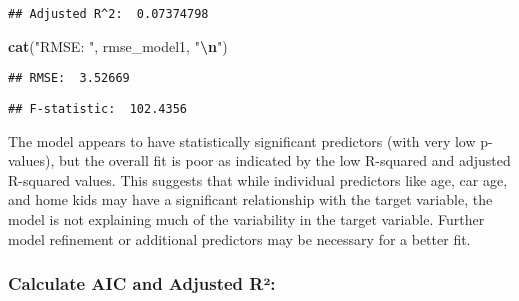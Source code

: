 \documentclass[
]{article}
\newenvironment{Shaded}{\begin{snugshade}}{\end{snugshade}}
\newcommand{\DecValTok}[1]{\textcolor[rgb]{0.00,0.00,0.81}{#1}}
\newcommand{\FunctionTok}[1]{\textcolor[rgb]{0.13,0.29,0.53}{\textbf{#1}}}
\newcommand{\NormalTok}[1]{#1}
\newcommand{\SpecialCharTok}[1]{\textcolor[rgb]{0.81,0.36,0.00}{\textbf{#1}}}
\newcommand{\StringTok}[1]{\textcolor[rgb]{0.31,0.60,0.02}{#1}}
\begin{document}
\begin{verbatim}
## Adjusted R^2:  0.07374798
\end{verbatim}

\begin{Shaded}
\begin{Highlighting}[]
\FunctionTok{cat}\NormalTok{(}\StringTok{"RMSE: "}\NormalTok{, rmse\_model1, }\StringTok{"}\SpecialCharTok{\textbackslash{}n}\StringTok{"}\NormalTok{)}
\end{Highlighting}
\end{Shaded}

\begin{verbatim}
## RMSE:  3.52669
\end{verbatim}

\begin{Shaded}
\end{Shaded}

\begin{verbatim}
## F-statistic:  102.4356
\end{verbatim}

The model appears to have statistically significant predictors (with
very low p-values), but the overall fit is poor as indicated by the low
R-squared and adjusted R-squared values. This suggests that while
individual predictors like age, car age, and home kids may have a
significant relationship with the target variable, the model is not
explaining much of the variability in the target variable. Further model
refinement or additional predictors may be necessary for a better fit.

\subsubsection{Calculate AIC and Adjusted
R²:}\label{calculate-aic-and-adjusted-ruxb2}
\end{document}

